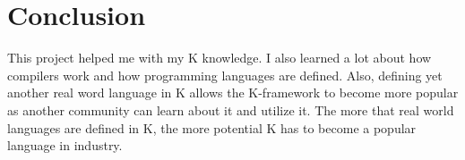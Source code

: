 \chapter{Conclusion}

This project helped me with my K knowledge. I also learned a lot about how compilers work and how programming languages are defined. Also, defining yet another real word language in K allows the K-framework to become more popular as another community can learn about it and utilize it. The more that real world languages are defined in K, the more potential K has to become a popular language in industry.
